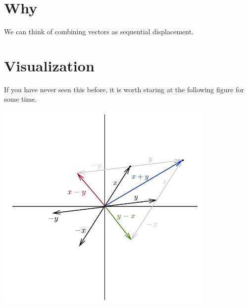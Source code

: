 

\section*{Why}

We can think of combining vectors as sequential displacement.

\section*{Visualization}

If you have never seen this before, it is worth staring at the following figure for some time.
\begin{center}  \includegraphics[width=0.80\textwidth]{./graphics/x-y-plane-vectors.pdf}\end{center}

\blankpage
